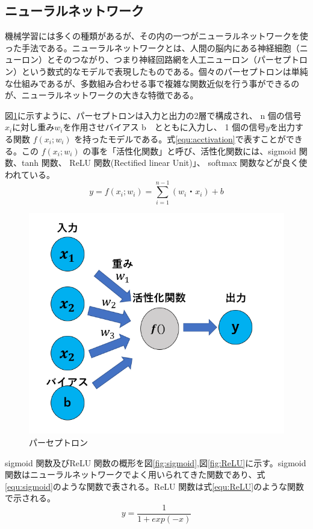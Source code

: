 \subsection{ニューラルネットワーク}
機械学習には多くの種類があるが、その内の一つがニューラルネットワークを使った手法である。ニューラルネットワークとは、人間の脳内にある神経細胞（ニューロン）とそのつながり、つまり神経回路網を人工ニューロン（パーセプトロン）という数式的なモデルで表現したものである。個々のパーセプトロンは単純な仕組みであるが、多数組み合わせる事で複雑な関数近似を行う事ができるのが、ニューラルネットワークの大きな特徴である。

図\ref{fig:perce}に示すように、パーセプトロンは入力と出力の2層で構成され、 n 個の信号$x_i$に対し重み$w_i$を作用させバイアス b　とともに入力し、 1 個の信号$y$を出力する関数 $f(x_i; w_i)$ を持ったモデルである。式\eqref{equ:acctivation}で表すことができる。この $f(x_i; w_i)$ の事を「活性化関数」と呼び、活性化関数には、sigmoid 関数、tanh 関数、 ReLU 関数(Rectified linear Unit)」、 softmax 関数などが良く使われている。 
\begin{equation}
    y = f(x_i; w_i) = \sum^{n-1}_{i=1}(w_i・x_i) + b
    \label{equ:acctivation}
\end{equation}
\begin{figure}[tb]
  \centering
  \includegraphics[clip, width=13cm]{fig/4/parceptron.png}
  \caption{パーセプトロン}
  \label{fig:perce}
\end{figure}
sigmoid 関数及びReLU 関数の概形を図\ref{fig:sigmoid},図\ref{fig:ReLU}に示す。sigmoid 関数はニューラルネットワークでよく用いられてきた関数であり、式\eqref{equ:sigmoid}のような関数で表される。ReLU 関数は式\eqref{equ:ReLU}のような関数で示される。
\begin{equation}
    y = \frac{1}{1+exp(-x)}
    \label{equ:sigmoid}
\end{equation}

